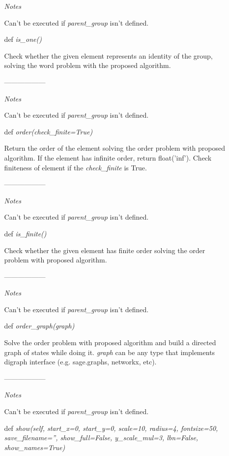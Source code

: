 \documentclass[a4paper,12pt]{amsart}
\begin{document}
\begin{itemize}
\begin{itemize}
		\textit{Notes}
		
		Can't be executed if \textit{parent\_group} isn't defined.
		
		\item[def] \textit{is\_one()}
		
		Check whether the given element represents an identity of the group, solving the word problem with the proposed algorithm.
		
		------------------
		
		\textit{Notes}
		
		Can't be executed if \textit{parent\_group} isn't defined.
		
		\item[def] \textit{order(check\_finite=True)}
		
		Return the order of the element solving the order problem with proposed algorithm. If the element has infinite order, return float('inf'). Check finiteness of element if the \textit{check\_finite} is True. 
		
		------------------
		
		\textit{Notes}
		
		Can't be executed if \textit{parent\_group} isn't defined.
		
		\item[def] \textit{is\_finite()}
		
		Check whether the given element has finite order solving the order problem with proposed algorithm. 
		
		------------------
		
		\textit{Notes}
		
		Can't be executed if \textit{parent\_group} isn't defined.
		
		\item[def] \textit{order\_graph(graph)}
		
		Solve the order problem with proposed algorithm and build a directed graph of states while doing it. \textit{graph} can be any type that implements digraph interface (e.g. sage.graphs, networkx, etc). 
		
		------------------
		
		\textit{Notes}
		
		Can't be executed if \textit{parent\_group} isn't defined.
	
		\item[def] \textit{show(self, start\_x=0, start\_y=0, scale=10, radius=4, fontsize=50,
			save\_filename='', show\_full=False, y\_scale\_mul=3, lbn=False,	show\_names=True)}
		

\end{itemize}
\end{itemize}
\end{document}

